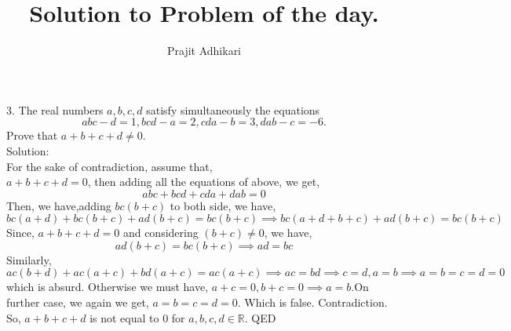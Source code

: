 \documentclass{article}
\begin{document}
\title{Solution to Problem of the day.}
\author{Prajit Adhikari}
\maketitle

3. The real numbers $a, b, c, d$ satisfy simultaneously the equations
$$abc - d = 1, bcd - a = 2, cda - b = 3, dab - c = -6.$$
Prove that $a + b + c + d \not = 0$.\\
Solution:\\
For the sake of contradiction, assume that,\\
$a+b+c+d=0$, then adding all the equations of above, we get,
$$abc+bcd+cda+dab=0$$
Then, we have,adding $bc(b+c)$ to both side, we have,
$$bc(a+d)+ bc(b+c)+ad(b+c)= bc(b+c) \implies bc(a+d+b+c)+ad(b+c)=bc(b+c)$$
Since, $a+b+c+d=0$ and considering $(b+c) \not = 0$, we have,
$$ad(b+c)=bc(b+c) \implies ad = bc$$
Similarly,
$$ ac(b+d)+ac(a+c)+bd(a+c)=ac(a+c) \implies ac=bd \implies c=d,a=b \implies a=b=c=d=0$$
which is absurd. Otherwise we must have, $a+c=0, b+c=0 \implies a=b$.On further case, we again we get, $a=b=c=d=0$. Which is false. Contradiction.
So, $a+b+c+d$ is not equal to $0$ for $a,b,c,d \in \mathbb{R}$. QED
\end{document}
